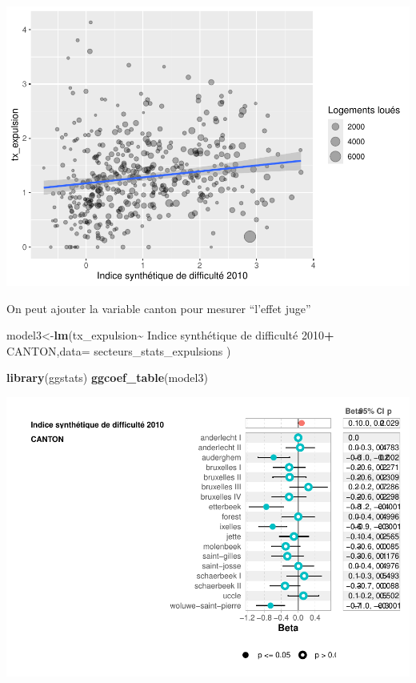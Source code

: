 \documentclass[
]{book}
\newenvironment{Shaded}{\begin{snugshade}}{\end{snugshade}}
\newcommand{\AttributeTok}[1]{\textcolor[rgb]{0.13,0.29,0.53}{#1}}
\newcommand{\FunctionTok}[1]{\textcolor[rgb]{0.13,0.29,0.53}{\textbf{#1}}}
\newcommand{\NormalTok}[1]{#1}
\newcommand{\OtherTok}[1]{\textcolor[rgb]{0.56,0.35,0.01}{#1}}
\newcommand{\SpecialCharTok}[1]{\textcolor[rgb]{0.81,0.36,0.00}{\textbf{#1}}}
\newcommand{\StringTok}[1]{\textcolor[rgb]{0.31,0.60,0.02}{#1}}
\begin{document}
\includegraphics{bookdown-demo_files/figure-latex/unnamed-chunk-40-1.pdf}

On peut ajouter la variable canton pour mesurer ``l'effet juge''

\begin{Shaded}
\begin{Highlighting}[]
\NormalTok{model3}\OtherTok{\textless{}{-}}\FunctionTok{lm}\NormalTok{(tx\_expulsion}\SpecialCharTok{\textasciitilde{}} \StringTok{\textasciigrave{}}\AttributeTok{Indice synthétique de difficulté 2010}\StringTok{\textasciigrave{}}\SpecialCharTok{+}\NormalTok{ CANTON,}\AttributeTok{data=}\NormalTok{ secteurs\_stats\_expulsions )}

\FunctionTok{library}\NormalTok{(ggstats)}
\FunctionTok{ggcoef\_table}\NormalTok{(model3)}
\end{Highlighting}
\end{Shaded}

\includegraphics{bookdown-demo_files/figure-latex/unnamed-chunk-41-1.pdf}
\end{document}

